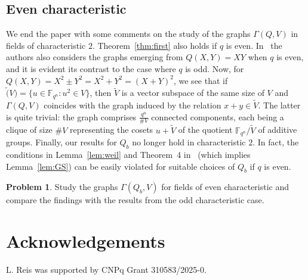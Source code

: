 \documentclass[11pt]{amsart}
\newcommand{\G}{\Gamma}
\newcommand{\F}{\mathbb F}
\theoremstyle{definition}
\newtheorem{problem}[theorem]{Problem}
\theoremstyle{remark}
\begin{document}
\subsection{Even characteristic}
We end the paper with some comments on the study of the graphs $\G(Q, V)$ in fields of characteristic $2$. Theorem~\ref{thm:first} also holds if $q$ is even. In~\cite{reis2} the authors also considers the graphs emerging from $Q(X, Y)=XY$ when $q$ is even, and it is evident its contrast to the case where $q$ is odd. Now, for $Q(X, Y)=X^2\pm Y^2=X^2+Y^2=(X+Y)^2$, we see that if $\tilde(V)=\{u\in \F_{q^n}: u^2\in V\}$, then $\tilde{V}$ is a vector subspace of the same size of $V$ and $\Gamma(Q, V)$ coincides with the graph induced by the relation $x+y\in \tilde{V}$. The latter is quite trivial: the graph comprises $\frac{q^n}{\# V}$ connected components, each being a clique of size $\# V$ representing the cosets $u+\tilde{V}$ of the quotient $\F_{q^n}/\tilde{V}$ of additive groups. Finally, our results for $Q_b$ no longer hold in characteristic $2$. In fact, the conditions in Lemma~\ref{lem:weil} and Theorem~4 in~\cite{GS} (which implies Lemma~\ref{lem:GS}) can be easily violated for suitable choices of $Q_b$ if $q$ is even. 

\begin{problem}
    Study the graphs $\G(Q_b, V)$ for fields of even characteristic and compare the findings with the results from the odd characteristic case.
\end{problem}









\section*{Acknowledgements}
 L. Reis was supported by CNPq Grant 310583/2025-0.




 
\end{document}
